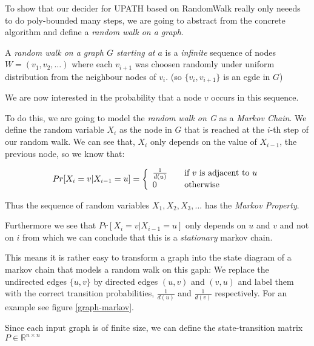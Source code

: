To show that our decider for UPATH based on RandomWalk really only
neeeds to do poly-bounded many steps, we are going to abstract from the
concrete algorithm and define a \emph{random walk on a graph}.

A \emph{random walk on a graph $G$ starting at $a$} is a \emph{infinite}
sequence of nodes $W = (v_1, v_2, \dots)$ where each $v_{i+1}$ was
choosen randomly under uniform distribution from the neighbour nodes of
$v_i$. (so $\{v_i, v_{i+1}\}$ is an egde in $G$)

We are now interested in the probability that a node $v$ occurs in this
sequence.

To do this, we are going to model the \emph{random walk on G} as a
\emph{Markov Chain}. We define the random variable $X_i$ as the node in
$G$ that is reached at the $i$-th step of our random walk. We can see
that, $X_i$ only depends on the value of $X_{i-1}$, the previous node,
so we know that:

\[ Pr[X_i = v | X_{i-1} = u] = \left\{
  \begin{array}{l l}
    \frac{1}{d(u)} & \quad \text{if $v$ is adjacent to $u$}\\
    0 & \quad \text{otherwise}
  \end{array} \right.
\]

Thus the sequence of random variables $X_1, X_2, X_3, ...$ has the
\emph{Markov Property}.

Furthermore we see that $Pr[X_i = v | X_{i-1} = u]$ only depends on $u$
and $v$ and not on $i$ from which we can conclude that this is a
\emph{stationary} markov chain.

This means it is rather easy to transform a graph into the state diagram
of a markov chain that models a random walk on this gaph: We replace the
undirected edges $\{u, v\}$ by directed edges $(u, v)$ and $(v, u)$ and
label them with the correct transition probabilities, $\frac{1}{d(u)}$
and $\frac{1}{d(v)}$ respectively. For an example see figure
\ref{graph-markov}.

Since each input graph is of finite size, we can define the
state-transition matrix $P \in \mathbb{R}^{n \times n}$

